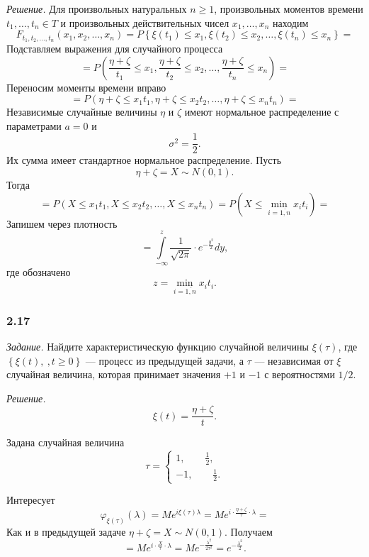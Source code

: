 \textit{Решение.}
Для произвольных натуральных $n \geq 1$,
произвольных моментов времени $t_1, \dotsc, t_n \in T$ и произвольных действительных чисел
$x_1, \dotsc, x_n$ находим
$$F_{t_1, t_2, \dotsc, t_n} \left( x_1, x_2, \dotsc, x_n \right) =
  P \left\{
    \xi \left( t_1 \right) \leq x_1, \xi \left( t_2 \right) \leq x_2, \dotsc,
    \xi \left( t_n \right) \leq x_n \right\} =$$
Подставляем выражения для случайного процесса
$$= P \left(
    \frac{ \eta + \zeta }{t_1} \leq x_1, \frac{ \eta + \zeta }{t_2} \leq x_2, \dotsc,
    \frac{ \eta + \zeta }{t_n} \leq x_n \right) =$$
Переносим моменты времени вправо
$$= P \left(
    \eta + \zeta \leq x_1 t_1, \eta + \zeta \leq x_2 t_2, \dotsc, \eta + \zeta \leq x_n t_n
  \right) =$$
Независимые случайные величины $ \eta $ и $ \zeta $ имеют нормальное распределение с параметрами
$a = 0$ и
$$ \sigma^2 =
  \frac{1}{2}.$$
Их сумма имеет стандартное нормальное распределение.
Пусть
$$ \eta + \zeta =
  X \sim
  N \left( 0, 1 \right).$$
Тогда
$$= P \left( X \leq x_1 t_1, X \leq x_2 t_2, \dotsc, X \leq x_n t_n \right) =
  P \left( X \leq \min \limits_{i = \overline{1, n}} x_i t_i \right) =$$
Запишем через плотность
$$= \int \limits_{- \infty }^z \frac{1}{ \sqrt{2 \pi }} \cdot e^{- \frac{y^2}{2}} dy,$$
где обозначено
$$z =
  \min \limits_{i = \overline{1, n}} x_i t_i.$$

\subsubsection*{2.17}

\textit{Задание.}
Найдите характеристическую функцию случайной величины $ \xi \left( \tau \right) $,
где $ \left\{ \xi \left( t \right),\ , t \geq 0 \right\} $ --- процесс из предыдущей задачи,
а $ \tau $ --- независимая от $ \xi $ случайная величина,
которая принимает значения $+1$ и $-1$ с вероятностями $1 / 2$.

\textit{Решение.}
$$ \xi \left( t \right) =
  \frac{ \eta + \zeta }{t}.$$

Задана случайная величина
$$ \tau =
  \begin{cases}
    1, \qquad \frac{1}{2}, \\
    -1, \qquad \frac{1}{2}.
  \end{cases}$$

Интересует
$$ \varphi_{ \xi \left( \tau \right) } \left( \lambda \right) =
  Me^{i \xi \left( \tau \right) \lambda } =
  Me^{i \cdot \frac{ \eta + \zeta }{ \tau } \cdot \lambda } =$$
Как и в предыдущей задаче $ \eta + \zeta = X \sim N \left( 0, 1 \right) $.
Получаем
$$= Me^{i \cdot \frac{X}{ \tau } \cdot \lambda } =
  Me^{-\frac{ \lambda ^2}{2 \tau^2}} =
  e^{- \frac{ \lambda^2}{2}}.$$
